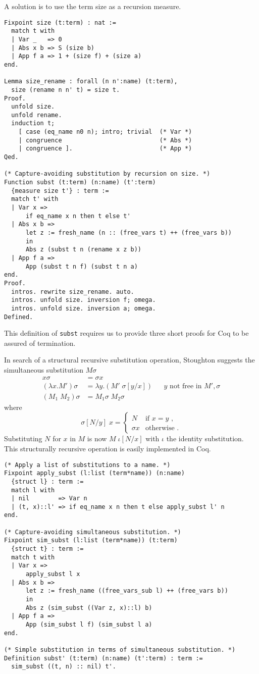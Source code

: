 \documentclass[a4paper,11pt]{article}
\begin{document}
A solution is to use the term size as a recursion measure.
\begin{lstlisting}
Fixpoint size (t:term) : nat :=
  match t with
  | Var _   => 0
  | Abs x b => S (size b)
  | App f a => 1 + (size f) + (size a)
end.

Lemma size_rename : forall (n n':name) (t:term),
  size (rename n n' t) = size t.
Proof.
  unfold size.
  unfold rename.
  induction t;
    [ case (eq_name n0 n); intro; trivial  (* Var *)
    | congruence                           (* Abs *)
    | congruence ].                        (* App *)
Qed.

(* Capture-avoiding substitution by recursion on size. *)
Function subst (t:term) (n:name) (t':term)
  {measure size t'} : term :=
  match t' with
  | Var x =>
      if eq_name x n then t else t'
  | Abs x b =>
      let z := fresh_name (n :: (free_vars t) ++ (free_vars b))
      in
      Abs z (subst t n (rename x z b))
  | App f a =>
      App (subst t n f) (subst t n a)
end.
Proof.
  intros. rewrite size_rename. auto.
  intros. unfold size. inversion f; omega.
  intros. unfold size. inversion a; omega.
Defined.
\end{lstlisting}
This definition of \lstinline{subst} requires us to provide three short
proofs for Coq to be assured of termination.

In search of a structural recursive substitution operation, Stoughton
suggests the simultaneous substitution $M \sigma$
\begin{align*}
  x \sigma              &= \sigma x\\
  (\lambda x.M') \sigma &= \lambda y.(M' \; \sigma[y/x])  && \text{$y$ not free in $M', \sigma$}\\
  (M_1 \; M_2) \sigma   &= M_1 \sigma \; M_2 \sigma
\end{align*}
where
\begin{equation*}
  \sigma[N/y] \; x =
  \begin{cases}
    N        & \text{if $x = y$ ,}\\
    \sigma x & \text{otherwise .}
  \end{cases}
\end{equation*}
Substituting $N$ for $x$ in $M$ is now $M \; \iota [N/x]$ with $\iota$
the identity substitution.
This structurally recursive operation is easily implemented in Coq.
\begin{lstlisting}
(* Apply a list of substitutions to a name. *)
Fixpoint apply_subst (l:list (term*name)) (n:name)
  {struct l} : term :=
  match l with
  | nil        => Var n
  | (t, x)::l' => if eq_name x n then t else apply_subst l' n
end.

(* Capture-avoiding simultaneous substitution. *)
Fixpoint sim_subst (l:list (term*name)) (t:term)
  {struct t} : term :=
  match t with
  | Var x =>
      apply_subst l x
  | Abs x b =>
      let z := fresh_name ((free_vars_sub l) ++ (free_vars b))
      in
      Abs z (sim_subst ((Var z, x)::l) b)
  | App f a =>
      App (sim_subst l f) (sim_subst l a)
end.

(* Simple substitution in terms of simultaneous substitution. *)
Definition subst' (t:term) (n:name) (t':term) : term :=
  sim_subst ((t, n) :: nil) t'.
\end{lstlisting}
\end{document}
